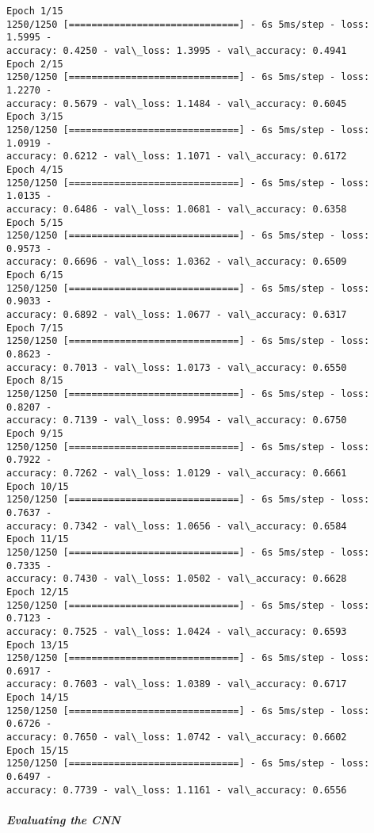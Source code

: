 \documentclass[11pt]{article}
\begin{document}
    \begin{Verbatim}[commandchars=\\\{\}]
Epoch 1/15
1250/1250 [==============================] - 6s 5ms/step - loss: 1.5995 -
accuracy: 0.4250 - val\_loss: 1.3995 - val\_accuracy: 0.4941
Epoch 2/15
1250/1250 [==============================] - 6s 5ms/step - loss: 1.2270 -
accuracy: 0.5679 - val\_loss: 1.1484 - val\_accuracy: 0.6045
Epoch 3/15
1250/1250 [==============================] - 6s 5ms/step - loss: 1.0919 -
accuracy: 0.6212 - val\_loss: 1.1071 - val\_accuracy: 0.6172
Epoch 4/15
1250/1250 [==============================] - 6s 5ms/step - loss: 1.0135 -
accuracy: 0.6486 - val\_loss: 1.0681 - val\_accuracy: 0.6358
Epoch 5/15
1250/1250 [==============================] - 6s 5ms/step - loss: 0.9573 -
accuracy: 0.6696 - val\_loss: 1.0362 - val\_accuracy: 0.6509
Epoch 6/15
1250/1250 [==============================] - 6s 5ms/step - loss: 0.9033 -
accuracy: 0.6892 - val\_loss: 1.0677 - val\_accuracy: 0.6317
Epoch 7/15
1250/1250 [==============================] - 6s 5ms/step - loss: 0.8623 -
accuracy: 0.7013 - val\_loss: 1.0173 - val\_accuracy: 0.6550
Epoch 8/15
1250/1250 [==============================] - 6s 5ms/step - loss: 0.8207 -
accuracy: 0.7139 - val\_loss: 0.9954 - val\_accuracy: 0.6750
Epoch 9/15
1250/1250 [==============================] - 6s 5ms/step - loss: 0.7922 -
accuracy: 0.7262 - val\_loss: 1.0129 - val\_accuracy: 0.6661
Epoch 10/15
1250/1250 [==============================] - 6s 5ms/step - loss: 0.7637 -
accuracy: 0.7342 - val\_loss: 1.0656 - val\_accuracy: 0.6584
Epoch 11/15
1250/1250 [==============================] - 6s 5ms/step - loss: 0.7335 -
accuracy: 0.7430 - val\_loss: 1.0502 - val\_accuracy: 0.6628
Epoch 12/15
1250/1250 [==============================] - 6s 5ms/step - loss: 0.7123 -
accuracy: 0.7525 - val\_loss: 1.0424 - val\_accuracy: 0.6593
Epoch 13/15
1250/1250 [==============================] - 6s 5ms/step - loss: 0.6917 -
accuracy: 0.7603 - val\_loss: 1.0389 - val\_accuracy: 0.6717
Epoch 14/15
1250/1250 [==============================] - 6s 5ms/step - loss: 0.6726 -
accuracy: 0.7650 - val\_loss: 1.0742 - val\_accuracy: 0.6602
Epoch 15/15
1250/1250 [==============================] - 6s 5ms/step - loss: 0.6497 -
accuracy: 0.7739 - val\_loss: 1.1161 - val\_accuracy: 0.6556
    \end{Verbatim}

    \hypertarget{evaluating-the-cnn}{%
\subparagraph{\texorpdfstring{\textbf{Evaluating the
CNN}}{Evaluating the CNN}}\label{evaluating-the-cnn}}
\end{document}
